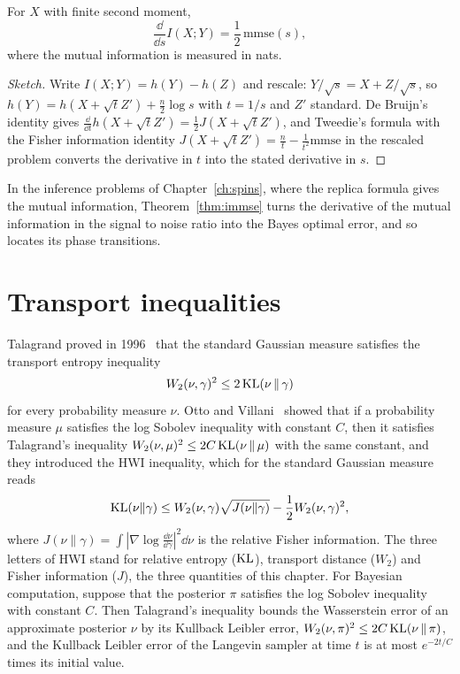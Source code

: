 \begin{theorem}
\label{thm:immse}
For $X$ with finite second moment,
\[
\frac{\dd}{\dd s}I(X;Y) = \frac12\,\mathrm{mmse}(s),
\]
where the mutual information is measured in nats.
\end{theorem}

\begin{proof}[Sketch]
Write $I(X;Y) = h(Y)-h(Z)$ and rescale: $Y/\sqrt s = X+Z/\sqrt s$, so $h(Y) = h(X+\sqrt tZ')+\frac n2\log s$ with $t = 1/s$ and $Z'$ standard. De Bruijn's identity gives $\frac{\dd}{\dd t}h(X+\sqrt tZ') = \frac12J(X+\sqrt tZ')$, and Tweedie's formula with the Fisher information identity $J(X+\sqrt tZ') = \frac nt-\frac{1}{t^2}\mathrm{mmse}$ in the rescaled problem converts the derivative in $t$ into the stated derivative in $s$.
\end{proof}

In the inference problems of Chapter~\ref{ch:spins}, where the replica formula gives the mutual information, Theorem~\ref{thm:immse} turns the derivative of the mutual information in the signal to noise ratio into the Bayes optimal error, and so locates its phase transitions.

\section{Transport inequalities}

Talagrand proved in 1996~\cite{talagrand1996} that the standard Gaussian measure satisfies the transport entropy inequality
\[
W_2(\nu,\gamma)^2\leq2\,\mathrm{KL}(\nu\,\|\,\gamma)
\]
for every probability measure $\nu$. Otto and Villani~\cite{ottovillani2000} showed that if a probability measure $\mu$ satisfies the log Sobolev inequality with constant $C$, then it satisfies Talagrand's inequality $W_2(\nu,\mu)^2\leq2C\,\mathrm{KL}(\nu\,\|\,\mu)$ with the same constant, and they introduced the HWI inequality, which for the standard Gaussian measure reads
\[
\mathrm{KL}(\nu\|\gamma)\leq W_2(\nu,\gamma)\sqrt{J(\nu\|\gamma)}-\frac12W_2(\nu,\gamma)^2,
\]
where $J(\nu\|\gamma) = \int|\nabla\log\frac{\dd\nu}{\dd\gamma}|^2\dd\nu$ is the relative Fisher information. The three letters of HWI stand for relative entropy ($\mathrm{KL}$), transport distance ($W_2$) and Fisher information ($J$), the three quantities of this chapter. For Bayesian computation, suppose that the posterior $\pi$ satisfies the log Sobolev inequality with constant $C$. Then Talagrand's inequality bounds the Wasserstein error of an approximate posterior $\nu$ by its Kullback Leibler error, $W_2(\nu,\pi)^2\leq2C\,\mathrm{KL}(\nu\,\|\,\pi)$, and the Kullback Leibler error of the Langevin sampler at time $t$ is at most $e^{-2t/C}$ times its initial value.


